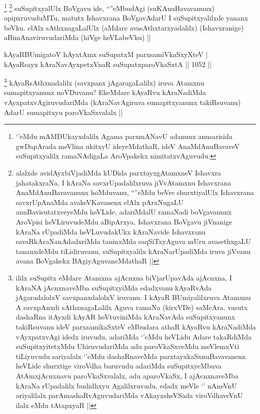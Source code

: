 \begin{artha}
\footnote{`\stext'eMdu mAMDUkayxdalilx Agama parxmANavU adanunx anusarisida gwDapArada meVlina ukitxyU ideyeMdathaR, ideV AnaMdAnuBavaveV suSupitxyalilx ramaNAdigaLa AroVpakekx nimitatxvAguvudu.}
\footnote{alalxde avidAyxbiVjadiMda kUDida parxtayxgAtamxneV Ishavxra ja{ha}takxraNa, I kAraNa savxrUpadalilxruva jiVvAtamxnu Ishavxrana AnaMdAnuBavavanunx hoMduvanu, ``\stext''eMdu beVre shurxtiyalUlx Ishavxrana savxrUpAnaMda avakeVKavanenx elAlx pArxNugaLU anuBavisutatxveyeMdu heVLide, adariMdalU ramaNadi boVgavanunx AroVpisi heVLiruvudeMdu aBipArxya, Ishavxrana BoVgavu jiVnanige kAraNa rUpadiMda heVLuvudakUkx kAraNavide Ishavxranu savaRkAraNanAdadxriMda taninxMda saqSiTxyAguva mUru avasethxgaLU tananxdeMdu tiLidiruvanu, suSupitxyalilx kAraNarUpadiMda iruva jiVvanu avana BoVgakekx BAgiyAguvaneMdathaR ||}
suSupitxyalUlx BoVgavu ide, ``\stext''eMbudAgi (suKAnuBavavanunx) opipxruvuduMTu, matutx Ishavxrana BoVgavAdarU I suSupitxyalilxde yananx beVku. elAlx sAthxnagaLalUlx (aMdare avasAthxtarxyadalilx) (Ishavxranige) aBimAnaviruvudariMda (hiVge heVLabeVku) ||
\end{artha}


\begin{shl}
kAyaRBUmigatoV hAyxtAmx suSupatxM parxsamiVkaSxyXteV | \\
kAyaRsayx kAraNavAyxpetxVnaR suSupatxparoVkaSxtA \hfill||  1052 ||  
\end{shl}

\begin{artha}
\footnote{ililx suSupitx eMdare Atamxna ajAcnxna biVjarUpavAda ajAcnxna, I kAraNA jAcnxnaveMba suSupitxyiMda edadxvanu kAyaRvAda jAgaradalolxV savxpanxdalolxV iruvanu. I kAyaR BUmiyalilxruva Atamxnu A savxpAnxdi sAthxnagaLalilx Aguva ramaNa (kirxVDe) saMcAra. vasutx dashaRna itAyxdi kAyAR heVtuviniMda kAraNavAda suSupitxyanunx takiRsuvanu ideV parxsamikaSxteV eMbudara athaR kAyaRvu kAraNadiMda vAyxpatxvAgi idedx iruvudu, adariMda `\stext'eMdu heVLidu Adare takaRdiMda suSupitxyitetxMdu UhisuvudariMda adu paroVkaSxveMdu meVlemxVti tiLiyuvudu sariyalalx `\stext'eMdu dashaRnaveMda parxtayxkaSxnuBavavanenx heVLide shurxtige viroVdha baruvudu adariMda suSupitxyeMbuva AtAmxjAcnxnavu paroVkaSxvalalx, adu aparoVkaSx, I ajAcnxnaveMba kAraNa rUpadalilx budidhxyu Agalilxruvudu, edadx meVle `\stext' nAneVnU ariyalilalx parAmashaRvAguvudariMda vAkayxsheVSada viroVdhaveVnU ilalx eMdu tAtapxyaR ||}
kAyaRsAthxnadalilx (savxpanx jAgaragaLalilx) iruva Atamxnu sumapitxyanunx noVDuvanu? EkeMdare kAyaRvu kAraNadiMda vAyxpatxvAgiruvudariMda (kAraNavAgiruva sumapitxyanunx takiRsuvanu) AdarU sumapitxyu paroVkaSxvalalx ||
\end{artha}

